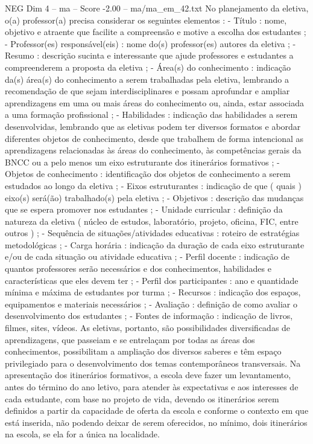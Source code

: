 \begin{textsample}{NEG Dim 4 – ma – Score -2.00 – ma/ma\_em\_42.txt}
No planejamento da eletiva, o(a) professor(a) precisa considerar os seguintes elementos : - Título : nome, objetivo e atraente que facilite a compreensão e motive a escolha dos estudantes ; - Professor(es) responsável(eis) : nome do(s) professor(es) autores da eletiva ; - Resumo : descrição sucinta e interessante que ajude professores e estudantes a compreenderem a proposta da eletiva ; - Área(s) do conhecimento : indicação da(s) área(s) do conhecimento a serem trabalhadas pela eletiva, lembrando a recomendação de que sejam interdisciplinares e possam aprofundar e ampliar aprendizagens em uma ou mais áreas do conhecimento ou, ainda, estar associada a uma formação profissional ; - Habilidades : indicação das habilidades a serem desenvolvidas, lembrando que as eletivas podem ter diversos formatos e abordar diferentes objetos de conhecimento, desde que trabalhem de forma intencional as aprendizagens relacionadas às áreas do conhecimento, às competências gerais da BNCC ou a pelo menos um eixo estruturante dos itinerários formativos ; - Objetos de conhecimento : identificação dos objetos de conhecimento a serem estudados ao longo da eletiva ; - Eixos estruturantes : indicação de que ( quais ) eixo(s) será(ão) trabalhado(s) pela eletiva ; - Objetivos : descrição das mudanças que se espera promover nos estudantes ; - Unidade curricular : definição da natureza da eletiva ( núcleo de estudos, laboratório, projeto, oficina, FIC, entre outros ) ; - Sequência de situações/atividades educativas : roteiro de estratégias metodológicas ; - Carga horária : indicação da duração de cada eixo estruturante e/ou de cada situação ou atividade educativa ; - Perfil docente : indicação de quantos professores serão necessários e dos conhecimentos, habilidades e características que eles devem ter ; - Perfil dos participantes : ano e quantidade mínima e máxima de estudantes por turma ; - Recursos : indicação dos espaços, equipamentos e materiais necessários ; - Avaliação : definição de como avaliar o desenvolvimento dos estudantes ; - Fontes de informação : indicação de livros, filmes, sites, vídeos.
As eletivas, portanto, são possibilidades diversificadas de aprendizagens, que passeiam e se entrelaçam por todas as áreas dos conhecimentos, possibilitam a ampliação dos diversos saberes e têm espaço privilegiado para o desenvolvimento dos temas contemporâneos transversais.
Na apresentação dos itinerários formativos, a escola deve fazer um levantamento, antes do término do ano letivo, para atender às expectativas e aos interesses de cada estudante, com base no projeto de vida, devendo os itinerários serem definidos a partir da capacidade de oferta da escola e conforme o contexto em que está inserida, não podendo deixar de serem oferecidos, no mínimo, dois itinerários na escola, se ela for a única na localidade.

\end{textsample}

